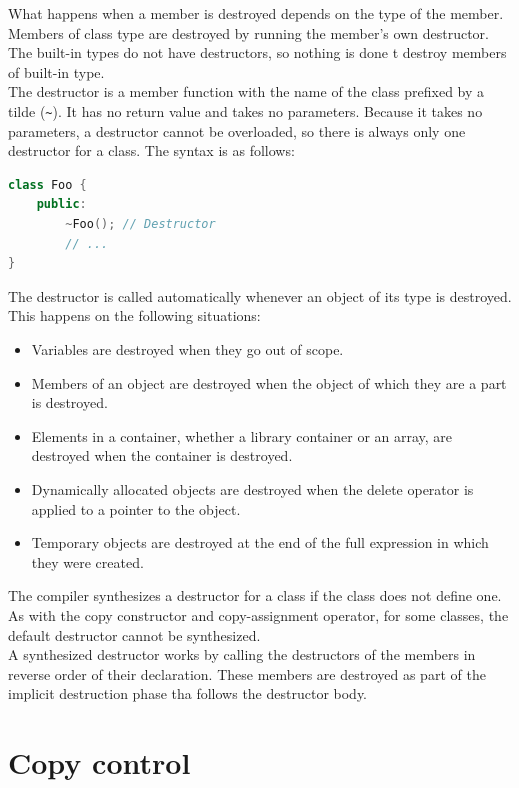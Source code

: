 What happens when a member is destroyed depends on the type of the member. Members of 
class type are destroyed by running the member's own destructor. The built-in types
do not have destructors, so nothing is done t destroy members of built-in type.\\

The destructor is a member function with the name of the class prefixed by a tilde (\texttt{\~}).
It has no return value and takes no parameters. Because it takes no parameters, a destructor
cannot be overloaded, so there is always only one destructor for a class. The syntax is as
follows:\\

\begin{lstlisting}[language=C++]
class Foo {
    public:
        ~Foo(); // Destructor
        // ...
}
\end{lstlisting}

The destructor is called automatically whenever an object of its type is destroyed. This
happens on the following situations:

\begin{itemize}
    \item Variables are destroyed when they go out of scope.
    \item Members of an object are destroyed when the object of which they are a part
    is destroyed.
    \item Elements in a container, whether a library container or an array, are destroyed
    when the container is destroyed.
    \item Dynamically allocated objects are destroyed when the delete operator is applied
    to a pointer to the object.
    \item Temporary objects are destroyed at the end of the full expression in which they
    were created.
\end{itemize}

The compiler synthesizes a destructor for a class if the class does not define one. 
As with the copy constructor and copy-assignment operator, for some
classes, the default destructor cannot be synthesized.\\

A synthesized destructor works by calling the destructors of the members in reverse order
of their declaration. These members are destroyed as part of the implicit destruction
phase tha follows the destructor body.

\section{Copy control}


